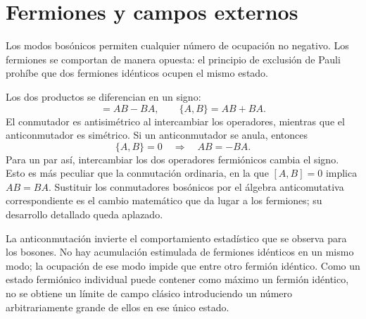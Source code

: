 \section{Fermiones y campos externos}

Los modos bosónicos permiten cualquier número de ocupación no negativo. Los fermiones se comportan de manera opuesta: el principio de exclusión de Pauli prohíbe que dos fermiones idénticos ocupen el mismo estado.

\begin{classroomqa}
\end{classroomqa}

Los dos productos se diferencian en un signo:
\begin{equation}
[A,B]=AB-BA,
\qquad
\{A,B\}=AB+BA.
\end{equation}
El conmutador es antisimétrico al intercambiar los operadores, mientras que el anticonmutador es simétrico. Si un anticonmutador se anula, entonces
\begin{equation}
\{A,B\}=0
\quad\Longrightarrow\quad
AB=-BA.
\end{equation}
Para un par así, intercambiar los dos operadores fermiónicos cambia el signo. Esto es más peculiar que la conmutación ordinaria, en la que \([A,B]=0\) implica \(AB=BA\). Sustituir los conmutadores bosónicos por el álgebra anticomutativa correspondiente es el cambio matemático que da lugar a los fermiones; su desarrollo detallado queda aplazado.

La anticonmutación invierte el comportamiento estadístico que se observa para los bosones. No hay acumulación estimulada de fermiones idénticos en un mismo modo; la ocupación de ese modo impide que entre otro fermión idéntico. Como un estado fermiónico individual puede contener como máximo un fermión idéntico, no se obtiene un límite de campo clásico introduciendo un número arbitrariamente grande de ellos en ese único estado.

\begin{classroomqa}
\end{classroomqa}

